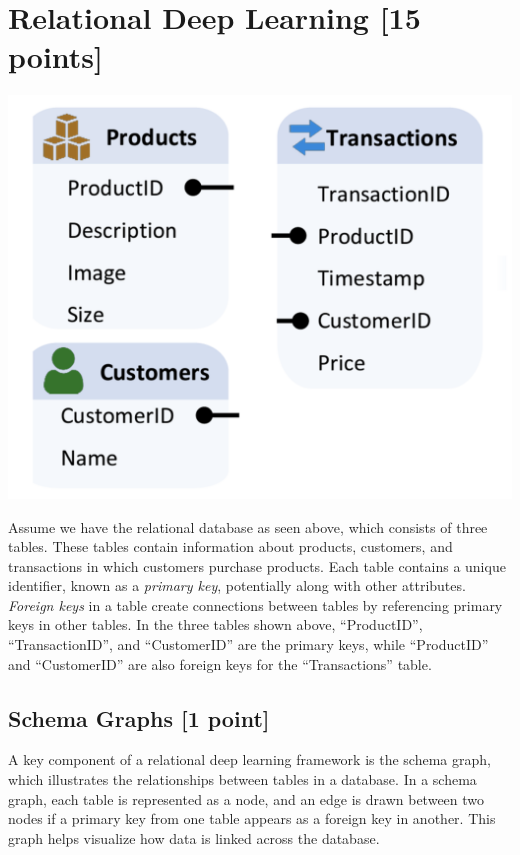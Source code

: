 \documentclass{article}
\numberwithin{figure}{section}
\begin{document}

\section{Relational Deep Learning [15 points]}

\begin{center}
    \includegraphics[scale=0.5]{hw3-rdl.png}
\end{center}

Assume we have the relational database as seen above, which consists of three tables. These tables contain information about products, customers, and transactions in which customers purchase products. Each table contains a unique identifier, known as a \textit{primary key}, potentially along with other attributes. \textit{Foreign keys} in a table create connections between tables by referencing primary keys in other tables. In the three tables shown above, “ProductID”, “TransactionID”, and “CustomerID” are the primary keys, while “ProductID” and “CustomerID” are also foreign keys for the “Transactions” table.

\subsection{Schema Graphs [1 point]}
A key component of a relational deep learning framework is the schema graph, which illustrates the relationships between tables in a database. In a schema graph, each table is represented as a node, and an edge is drawn between two nodes if a primary key from one table appears as a foreign key in another. This graph helps visualize how data is linked across the database.
\end{document}
